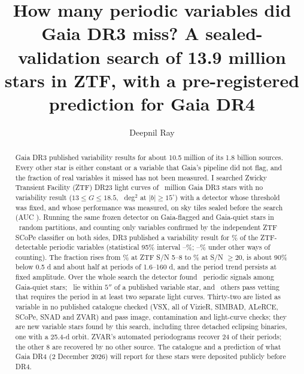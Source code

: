 \documentclass[twocolumn]{searchchev_preprint}
\begin{document}
\title{How many periodic variables did Gaia DR3 miss? A sealed-validation search of 13.9 million stars in ZTF,
with a pre-registered prediction for Gaia DR4}

\author[0000-0001-8779-0700]{Deepnil Ray}

\begin{abstract}
Gaia DR3 published variability results for about 10.5 million of its 1.8 billion sources. Every other star is
either constant or a variable that Gaia's pipeline did not flag, and the fraction of real variables it missed has
not been measured. I searched Zwicky Transient Facility (ZTF) DR23 light curves of \nscoredM\ million Gaia DR3 stars
with no variability result ($13\le G\le18.5$, \narea\ deg$^2$ at $|b|\ge15^\circ$) with a detector whose threshold was
fixed, and whose performance was measured, on sky tiles sealed before the search (AUC \nauc). Running the same
frozen detector on Gaia-flagged and Gaia-quiet stars in \nbNtiles\ random partitions, and counting only variables
confirmed by the independent ZTF SCoPe classifier on both sides, DR3 published a variability result for \nbCsc\% of the
ZTF-detectable periodic variables (statistical 95\% interval \nbCsclo--\nbCschi\%; \nbCall--\nbCsup\% under other
ways of counting). The fraction rises from \nbCsnlow\% at ZTF S/N 5--8 to \nbCsnhigh\% at S/N $\ge20$, is about 90\%
below 0.5 d and about half at periods of 1.6--160 d, and the period trend persists at fixed amplitude. Over the whole
search the detector found \nhitsmain\ periodic signals among Gaia-quiet stars; \nhitsknownext\ lie within $5''$ of a
published variable star, and \nnAB\ others pass vetting that requires the period in at least two separate light
curves. Thirty-two are listed as variable in no published catalogue checked (VSX, all of VizieR, SIMBAD, ALeRCE, SCoPe,
SNAD and ZVAR) and pass image, contamination and light-curve checks; they are new variable stars found by this search,
including three detached eclipsing binaries, one with a 25.4-d orbit. ZVAR's automated periodograms recover 24 of
their periods; the other 8 are recovered by no other source. The catalogue and a prediction of what Gaia DR4
(2 December 2026) will report for these stars were deposited publicly before DR4.
\end{abstract}

\end{document}

